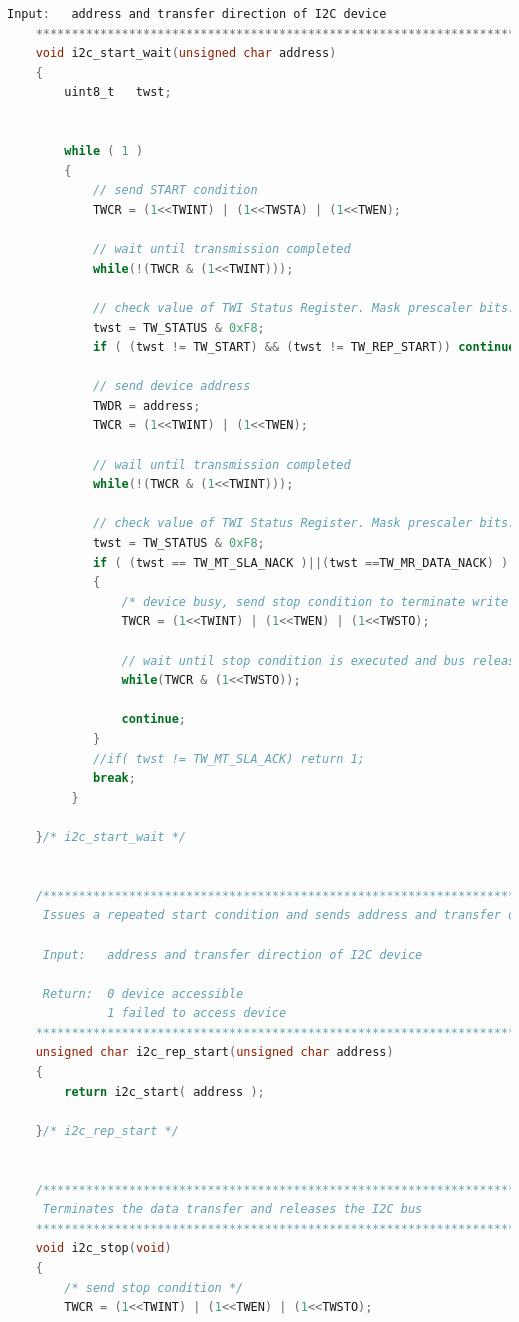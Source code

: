 \documentclass{article}
\numberwithin{figure}{section}
\numberwithin{equation}{section}
\begin{document}
{\begin{lstlisting}[language=C,label=lst:twimaster.c,caption=twimaster.c]
     Input:   address and transfer direction of I2C device
    *************************************************************************/
    void i2c_start_wait(unsigned char address)
    {
        uint8_t   twst;


        while ( 1 )
        {
    	    // send START condition
    	    TWCR = (1<<TWINT) | (1<<TWSTA) | (1<<TWEN);

        	// wait until transmission completed
        	while(!(TWCR & (1<<TWINT)));

        	// check value of TWI Status Register. Mask prescaler bits.
        	twst = TW_STATUS & 0xF8;
        	if ( (twst != TW_START) && (twst != TW_REP_START)) continue;

        	// send device address
        	TWDR = address;
        	TWCR = (1<<TWINT) | (1<<TWEN);

        	// wail until transmission completed
        	while(!(TWCR & (1<<TWINT)));

        	// check value of TWI Status Register. Mask prescaler bits.
        	twst = TW_STATUS & 0xF8;
        	if ( (twst == TW_MT_SLA_NACK )||(twst ==TW_MR_DATA_NACK) )
        	{
        	    /* device busy, send stop condition to terminate write operation */
    	        TWCR = (1<<TWINT) | (1<<TWEN) | (1<<TWSTO);

    	        // wait until stop condition is executed and bus released
    	        while(TWCR & (1<<TWSTO));

        	    continue;
        	}
        	//if( twst != TW_MT_SLA_ACK) return 1;
        	break;
         }

    }/* i2c_start_wait */


    /*************************************************************************
     Issues a repeated start condition and sends address and transfer direction

     Input:   address and transfer direction of I2C device

     Return:  0 device accessible
              1 failed to access device
    *************************************************************************/
    unsigned char i2c_rep_start(unsigned char address)
    {
        return i2c_start( address );

    }/* i2c_rep_start */


    /*************************************************************************
     Terminates the data transfer and releases the I2C bus
    *************************************************************************/
    void i2c_stop(void)
    {
        /* send stop condition */
    	TWCR = (1<<TWINT) | (1<<TWEN) | (1<<TWSTO);


\end{lstlisting}}
\end{document}
